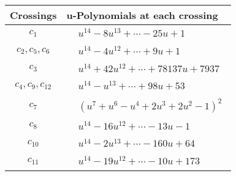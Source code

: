 \documentclass[1p]{elsarticle_modified}
\theoremstyle{definition}
\begin{document}
\begin{tabular}{m{50pt}|m{274pt}}
Crossings & \hspace{64pt}u-Polynomials at each crossing \\
\hline $$\begin{aligned}c_{1}\end{aligned}$$&$\begin{aligned}
&u^{14}-8 u^{13}+\cdots-25 u+1
\end{aligned}$\\
\hline $$\begin{aligned}c_{2},c_{5},c_{6}\end{aligned}$$&$\begin{aligned}
&u^{14}-4 u^{12}+\cdots+9 u+1
\end{aligned}$\\
\hline $$\begin{aligned}c_{3}\end{aligned}$$&$\begin{aligned}
&u^{14}+42 u^{12}+\cdots+78137 u+7937
\end{aligned}$\\
\hline $$\begin{aligned}c_{4},c_{9},c_{12}\end{aligned}$$&$\begin{aligned}
&u^{14}- u^{13}+\cdots+98 u+53
\end{aligned}$\\
\hline $$\begin{aligned}c_{7}\end{aligned}$$&$\begin{aligned}
&(u^7+u^6- u^4+2 u^3+2 u^2-1)^2
\end{aligned}$\\
\hline $$\begin{aligned}c_{8}\end{aligned}$$&$\begin{aligned}
&u^{14}-16 u^{12}+\cdots-13 u-1
\end{aligned}$\\
\hline $$\begin{aligned}c_{10}\end{aligned}$$&$\begin{aligned}
&u^{14}-2 u^{13}+\cdots-160 u+64
\end{aligned}$\\
\hline $$\begin{aligned}c_{11}\end{aligned}$$&$\begin{aligned}
&u^{14}-19 u^{12}+\cdots-10 u+173
\end{aligned}$\\
\hline
\end{tabular}\\~\\
\end{document}
